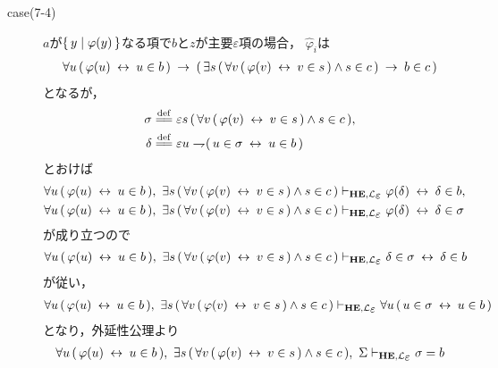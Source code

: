\begin{metaprf}
\begin{description}
\begin{description}
					\item[case(7-4)] $a$が$\{\, y \mid \varphi(y)\, \}$なる項で$b$と$z$が主要$\varepsilon$項の場合，
						$\widehat{\varphi}_{i}$は
						\begin{align}
							\forall u\, (\, \varphi(u) \hspace{0.25em}\leftrightarrow\hspace{0.25em} u \in b\, ) 
							\hspace{0.25em}\rightarrow\hspace{0.25em} (\, \exists s\, (\, \forall v\, (\, \varphi(v) \hspace{0.25em}\leftrightarrow\hspace{0.25em} v \in s\, ) \wedge s \in c\, )
							\hspace{0.25em}\rightarrow\hspace{0.25em} b \in c\, )
						\end{align}
						となるが，
						\begin{align}
							\sigma &\defeq \varepsilon s\, (\, \forall v\, (\, \varphi(v) \lrarrow v \in s\, ) \wedge s \in c\, ), \\
							\delta &\defeq \varepsilon u \negation (\, u \in \sigma \lrarrow u \in b\, )
						\end{align}
						とおけば
						\begin{align}
							\forall u\, (\, \varphi(u) \lrarrow u \in b\, ),\ 
							\exists s\, (\, \forall v\, (\, \varphi(v) \lrarrow v \in s\, ) \wedge s \in c\, )
							&\provable{\mbox{{\bf HE}},\lang{\varepsilon}} \varphi(\delta) \lrarrow \delta \in b, \\
							\forall u\, (\, \varphi(u) \lrarrow u \in b\, ),\ 
							\exists s\, (\, \forall v\, (\, \varphi(v) \lrarrow v \in s\, ) \wedge s \in c\, )
							&\provable{\mbox{{\bf HE}},\lang{\varepsilon}} \varphi(\delta) \lrarrow \delta \in \sigma
						\end{align}
						が成り立つので
						\begin{align}
							\forall u\, (\, \varphi(u) \lrarrow u \in b\, ),\ 
							\exists s\, (\, \forall v\, (\, \varphi(v) \lrarrow v \in s\, ) \wedge s \in c\, )
							\provable{\mbox{{\bf HE}},\lang{\varepsilon}} \delta \in \sigma \lrarrow \delta \in b
						\end{align}
						が従い，
						\begin{align}
							\forall u\, (\, \varphi(u) \lrarrow u \in b\, ),\ 
							\exists s\, (\, \forall v\, (\, \varphi(v) \lrarrow v \in s\, ) \wedge s \in c\, )
							\provable{\mbox{{\bf HE}},\lang{\varepsilon}} \forall u\, (\, u \in \sigma \lrarrow u \in b\, )
						\end{align}
						となり，外延性公理より
						\begin{align}
							\forall u\, (\, \varphi(u) \lrarrow u \in b\, ),\ 
							\exists s\, (\, \forall v\, (\, \varphi(v) \lrarrow v \in s\, ) \wedge s \in c\, ),\ 
							\Sigma
							\provable{\mbox{{\bf HE}},\lang{\varepsilon}} \sigma = b
						\end{align}

\end{description}
\end{description}
\end{metaprf}
